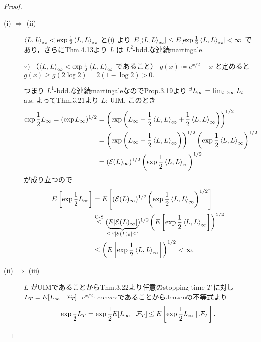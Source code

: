 \documentclass{jsarticle}
\begin{document}
\begin{proof}
    \begin{description}
        \item[(i) $\Rightarrow$ (ii)]
        $\left\langle L,L\right\rangle_\infty<\exp\frac{1}{2}\left\langle L,L\right\rangle_\infty$ と(i) より $E[\left\langle L,L\right\rangle_{\infty}]\le E[\exp\frac{1}{2}\left\langle L,L\right\rangle_{\infty}]<\infty$ であり，さらにThm.4.13より $L$ は $L^2$-bdd.な連続martingale.
        \begin{screen}
            $\because)$ （$\left\langle L,L\right\rangle_\infty<\exp\frac{1}{2}\left\langle L,L\right\rangle_\infty$ であること）
            $g(x)\coloneqq e^{x/2}-x$ と定めると $g(x)\ge g(2\log 2)=2(1-\log 2)>0.$
        \end{screen}
        
        つまり $L^1$-bdd.な連続martingaleなのでProp.3.19より ${}^{\exists} L_\infty=\lim_{t\to\infty}L_t$ a.s.
        よってThm.3.21より $L$: UIM.
        このとき
        \begin{align}
            \exp\frac{1}{2}L_{\infty}
            = (\exp L_\infty)^{1/2}
            &= \left(\exp\left(L_\infty-\frac{1}{2}\left\langle L,L\right\rangle_{\infty}+\frac{1}{2}\left\langle L,L\right\rangle_{\infty}\right)\right)^{1/2} \\
            &= \left(\exp\left(L_\infty-\frac{1}{2}\left\langle L,L\right\rangle_{\infty}\right)\right)^{1/2}
            \left(\exp\frac{1}{2}\left\langle L,L\right\rangle_{\infty}\right)^{1/2} \\
            &= (\mathcal{E}(L)_{\infty})^{1/2}\left(\exp\frac{1}{2}\left\langle L,L\right\rangle_{\infty}\right)^{1/2}
        \end{align}
        が成り立つので
        \begin{align}
            E\left[\exp\frac{1}{2}L_{\infty}\right]
            &= E\left[(\mathcal{E}(L)_{\infty})^{1/2}\left(\exp\frac{1}{2}\gen{L,L}_{\infty}\right)^{1/2}\right] \\
            &\stackrel{\text{C-S}}{\le} (\UB{E[\mathcal{E}(L)_{\infty}]}{\le E[\mathcal{E}(L)_0]\le1})^{1/2}
            \left(E\left[\exp\frac{1}{2}\gen{L,L}_{\infty}\right]\right)^{1/2} \\
            &\le \left(E\left[\exp\frac{1}{2}\gen{L,L}_{\infty}\right]\right)^{1/2}
            < \infty.
        \end{align}
        
        \item[(ii) $\Rightarrow$ (iii)]
        $L$ がUIMであることからThm.3.22より任意のstopping time $T$ に対し $L_T=E[L_{\infty}\mid\mathcal{F}_T].$
        $e^{x/2}$: convexであることからJensenの不等式より
        \begin{align}
            \exp\frac{1}{2}L_T
            = \exp\frac{1}{2}E[L_{\infty}\mid\mathcal{F}_T]
            \le E\left[\exp\frac{1}{2}L_{\infty}\mid\mathcal{F}_T\right].
        \end{align}


\end{description}
\end{proof}
\end{document}
